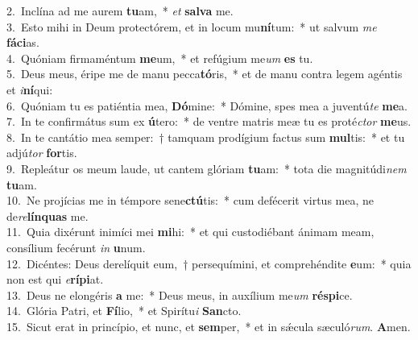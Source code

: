 {2.~}Inclína ad me aurem \textbf{tu}am,~* \textit{et} \textbf{sal}\textbf{va} me.\\
{3.~}Esto mihi in Deum protectórem, et in locum mu\textbf{ní}tum:~* ut salvum \textit{me} \textbf{fá}\textbf{ci}as.\\
{4.~}Quóniam firmaméntum \textbf{me}um,~* et refúgium me\textit{um} \textbf{es} tu.\\
{5.~}Deus meus, éripe me de manu pecca\textbf{tó}ris,~* et de manu contra legem agéntis et \textit{i}\textbf{ní}qui:\\
{6.~}Quóniam tu es patiéntia mea, \textbf{Dó}mine:~* Dómine, spes mea a juventú\textit{te} \textbf{me}a.\\
{7.~}In te confirmátus sum ex \textbf{ú}tero:~* de ventre matris meæ tu es proté\textit{ctor} \textbf{me}us.\\
{8.~}In te cantátio mea semper:~† tamquam prodígium factus sum \textbf{mul}tis:~* et tu adjú\textit{tor} \textbf{for}tis.\\
{9.~}Repleátur os meum laude, ut cantem glóriam \textbf{tu}am:~* tota die magnitúdi\textit{nem} \textbf{tu}am.\\
{10.~}Ne projícias me in témpore sene\textbf{ctú}tis:~* cum defécerit virtus mea, ne de\textit{re}\textbf{lín}\textbf{quas} me.\\
{11.~}Quia dixérunt inimíci mei \textbf{mi}hi:~* et qui custodiébant ánimam meam, consílium fecérunt \textit{in} \textbf{u}num.\\
{12.~}Dicéntes: Deus derelíquit eum,~† persequímini, et comprehéndite \textbf{e}um:~* quia non est qui \textit{e}\textbf{rí}\textbf{pi}at.\\
{13.~}Deus ne elongéris \textbf{a} me:~* Deus meus, in auxílium me\textit{um} \textbf{ré}\textbf{spi}ce.\\
{14.~}Glória Patri, et \textbf{Fí}lio,~* et Spirítu\textit{i} \textbf{San}cto.\\
{15.~}Sicut erat in princípio, et nunc, et \textbf{sem}per,~* et in sǽcula sæculó\textit{rum}. \textbf{A}men.\\
